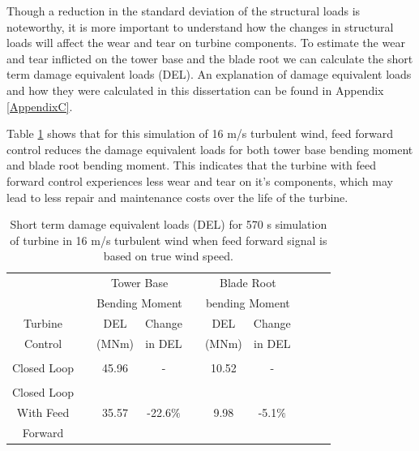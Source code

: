 Though a reduction in the standard deviation of the structural loads is noteworthy, it is more important to understand how the changes in structural loads will affect the wear and tear on turbine components. To estimate the wear and tear inflicted on the tower base and the blade root we can calculate the short term damage equivalent loads (DEL). An explanation of damage equivalent loads and how they were calculated in this dissertation can be found in Appendix \ref{AppendixC}. 

Table \ref{Table3-3} shows that for this simulation of 16 m/s turbulent wind, feed forward control reduces the damage equivalent loads for both tower base bending moment and blade root bending moment. This indicates that the turbine with feed forward control experiences less wear and tear on it's components, which may lead to less repair and maintenance costs over the life of the turbine.


\begin{table}
\centering
\begin{tabular}{ c | c c c c c c c c c}
\hline
\hline
					&&\multicolumn{2}{c}{Tower Base}					&&\multicolumn{2}{c}{Blade	Root} \\
					&&\multicolumn{2}{c}{Bending Moment}			&&\multicolumn{2}{c}{bending Moment}\\
						\cline{3-4} 														\cline{6-7}
Turbine			&& DEL   	& Change										&& DEL  	& Change\\
Control			&& (MNm)  & in DEL 										&& (MNm)  & in DEL 	\\
\hline
\\
Closed Loop  && 45.96 & - 													&& 10.52 & - \\
 \\
Closed Loop\\
With Feed  		&& 35.57 & -22.6$\%$ 									&& 9.98 & -5.1$\%$\\
Forward\\
\hline
\hline
\end{tabular}
\caption{Short term damage equivalent loads (DEL) for 570 s simulation of turbine in 16 m/s turbulent wind when feed forward signal is based on true wind speed.}
\label{Table3-3}
\end{table}


